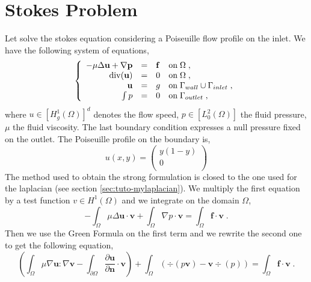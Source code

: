 %

\section{Stokes Problem}
\label{sec:tuto-mystokes}

Let solve the stokes equation considering a Poiseuille flow profile 
on the inlet. We have the following system of equations,
%
\begin{equation}
\left\{
\begin{array}{rcll}
-\mu\Delta \bf u + \nabla p & = & \bf f & \text{on}\; \Omega \;, \\
                \div(\bf u) & = & 0 & \text{on}\; \Omega \;, \\
                     \bf u  & = & g & \text{on}\; \Gamma_{wall}\cup\Gamma_{inlet} \;, \\
                     \int p & = & 0 & \text{on}\; \Gamma_{outlet} \;, \\
\end{array}
\right.
\label{eq:tuto-stk}
\end{equation}
%
where $u\in [H_g^1(\Omega)]^d$ denotes the flow speed, $p\in [L_0^2(\Omega)]$ the fluid pressure, $\mu$ the 
fluid viscosity.
The last boundary condition expresses a null pressure fixed
on the outlet. The Poiseuille profile on the boundary is,
%
\begin{equation}
u(x,y)=
\left(
\begin{array}{c}
 y(1-y) \\
 0      \\
\end{array}
\right)
\end{equation}
%
The method used to obtain the strong formulation is closed to the one used
for the laplacian (see section \ref{sec:tuto-mylaplacian}).
We multiply the first equation by a test function $v\in H^1(\Omega)$
and we integrate on the domain $\Omega$,
%
\begin{equation}
-\int_\Omega \mu \Delta \mathbf u \cdot \mathbf v
+\int_\Omega \nabla p \cdot \mathbf v
=\int_\Omega \mathbf f \cdot \mathbf v \;.
\end{equation}
%
Then we use the Green Formula on the first term and we rewrite the second one 
to get the following equation,
%
\begin{equation}
\left(
\int_\Omega \mu \nabla \mathbf u : \nabla \mathbf v
-\int_{\partial\Omega} \frac{\partial \mathbf u}{\partial \mathbf n} \cdot \mathbf v
\right)
+\int_\Omega ( \div(p \mathbf v) - \mathbf v \div(p) )
=\int_\Omega \mathbf f \cdot \mathbf v \;.
\label{eq:tuto-stk-1}
\end{equation}
